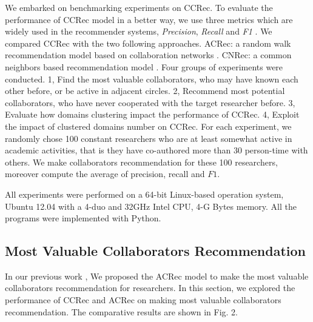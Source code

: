 \documentclass[review]{elsarticle}
\begin{document}
We embarked on benchmarking experiments on CCRec. To evaluate the performance of CCRec model in a better way, we use three metrics which are widely used in the recommender systems, \emph{Precision}, \emph{Recall} and \emph{F1} \cite{shani2011evaluating}. We compared CCRec with the two following approaches. ACRec: a random walk recommendation model based on collaboration networks \cite{li2014acrec}. CNRec: a common neighbors based recommendation model \cite{lopes2010collaboration}. Four groups of experiments were conducted. 1, Find the most valuable collaborators, who may have known each other before, or be active in adjacent circles. 2, Recommend most potential collaborators, who have never cooperated with the target researcher before. 3, Evaluate how domains clustering impact the performance of CCRec. 4, Exploit the impact of clustered domains number on CCRec. For each experiment, we randomly chose 100 constant researchers who are at least somewhat active in academic activities, that is they have co-authored more than 30 person-time with others. We make collaborators recommendation for these 100 researchers, moreover compute the average of precision, recall and $F1$.

All experiments were performed on a 64-bit Linux-based operation system, Ubuntu 12.04 with a 4-duo and 32GHz Intel CPU, 4-G Bytes memory. All the programs were implemented with Python.

\subsection{Most Valuable Collaborators Recommendation}
In our previous work \cite{li2014acrec}, We proposed the ACRec model to make the most valuable collaborators recommendation for researchers. In this section, we explored the performance of CCRec and ACRec on making most valuable collaborators recommendation. The comparative results are shown in Fig. 2.
\end{document}
